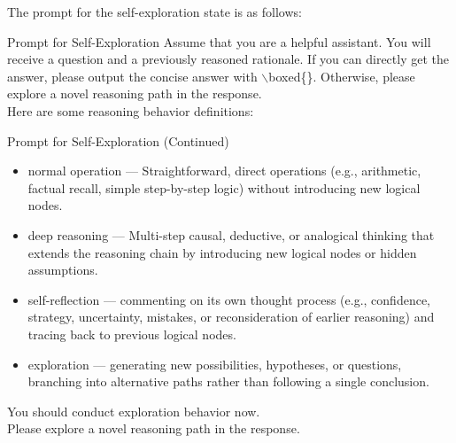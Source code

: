 The prompt for the self-exploration state is as follows:
\begin{PromptBox}{Prompt for Self-Exploration}
Assume that you are a helpful assistant. You will receive a question and a previously reasoned rationale. If you can directly get the answer, please output the concise answer with $\backslash$boxed\{\}. Otherwise, please explore a novel reasoning path in the response.\\

Here are some reasoning behavior definitions:
\end{PromptBox}
\begin{PromptBox}{Prompt for Self-Exploration (Continued)}

\begin{itemize}[leftmargin=16pt, itemsep=0pt, topsep=0pt]
    \item normal operation — Straightforward, direct operations (e.g., arithmetic, factual recall, simple step-by-step logic) without introducing new logical nodes.
    \item deep reasoning — Multi-step causal, deductive, or analogical thinking that extends the reasoning chain by introducing new logical nodes or hidden assumptions.

    \item self-reflection — commenting on its own thought process (e.g., confidence, strategy, uncertainty, mistakes, or reconsideration of earlier reasoning) and tracing back to previous logical nodes.
    \item exploration — generating new possibilities, hypotheses, or questions, branching into alternative paths rather than following a single conclusion.
\end{itemize}

You should conduct exploration behavior now.\\

  Please explore a novel reasoning path in the response.
\end{PromptBox}


